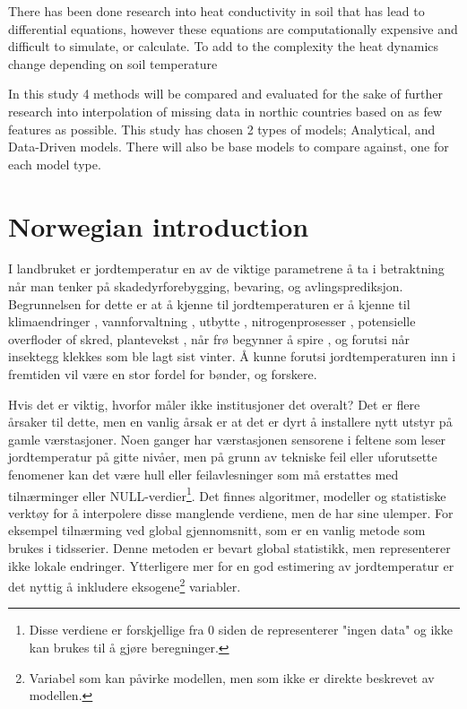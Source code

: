 There has been done research into heat conductivity in soil that has lead to differential equations\cite{karvonen_model_1988}, however these equations\cite{fourier_analytical_2009,karvonen_model_1988} are computationally expensive and difficult to simulate, or calculate\cite{rankinen_simple_2004}. To add to the complexity the heat dynamics change depending on soil temperature

In this study 4 methods will be compared and evaluated for the sake of further research into interpolation of missing data in northic countries based on as few features as possible. This study has chosen 2 types of models; Analytical, and Data-Driven models. There will also be base models to compare against, one for each model type. 

\section{Norwegian introduction}

I landbruket er jordtemperatur en av de viktige parametrene å ta i betraktning når man tenker på skadedyrforebygging, bevaring, og avlingsprediksjon. Begrunnelsen for dette er at å kjenne til jordtemperaturen er å kjenne til klimaendringer \cite{li_attention-aware_2022}, vannforvaltning \cite{alizamir_advanced_2020}, utbytte \cite{sim_prediction_2020}, nitrogenprosesser \cite{rankinen_simple_2004}, potensielle overfloder of skred\cite{stuurop_influence_2022}, plantevekst \cite{li_modeling_2020}, når frø begynner å spire \cite{li_modeling_2020}, og forutsi når insektegg klekkes som ble lagt sist vinter. Å kunne forutsi jordtemperaturen inn i fremtiden vil være en stor fordel for bønder, og forskere.

Hvis det er viktig, hvorfor måler ikke institusjoner det overalt? Det er flere årsaker til dette, men en vanlig årsak er at det er dyrt å installere nytt utstyr på gamle værstasjoner. Noen ganger har værstasjonen sensorene i feltene som leser jordtemperatur på gitte nivåer, men på grunn av tekniske feil eller uforutsette fenomener kan det være hull eller feilavlesninger som må erstattes med tilnærminger eller NULL-verdier\footnote{Disse verdiene er forskjellige fra 0 siden de representerer "ingen data" og ikke kan brukes til å gjøre beregninger.}. Det finnes algoritmer, modeller og statistiske verktøy for å interpolere disse manglende verdiene, men de har sine ulemper. For eksempel tilnærming ved global gjennomsnitt, som er en vanlig metode som brukes i tidsserier\cite{lepot_interpolation_2017}. Denne metoden er bevart global statistikk, men representerer ikke lokale endringer. Ytterligere mer for en god estimering av jordtemperatur er det nyttig å inkludere eksogene\footnote{Variabel som kan påvirke modellen, men som ikke er direkte beskrevet av modellen.} variabler.

